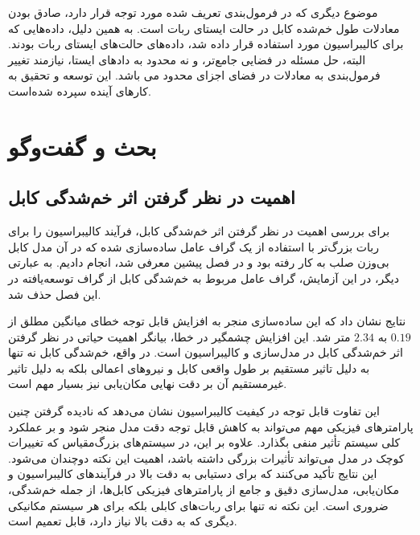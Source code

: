 موضوع دیگری که در فرمول‌بندی تعریف شده مورد توجه قرار دارد، صادق بودن معادلات طول خم‌شده کابل در حالت ایستای ربات است. به همین دلیل، داده‌هایی که برای کالیبراسیون مورد استفاده قرار داده‌ شد، داده‌‌های حالت‌های ایستای ربات بودند. البته، حل مسئله در فضایی جامع‌تر، و نه محدود به داد‌های ایستا، نیازمند تغییر فرمول‌بندی به معادلات در فضای اجزای محدود می باشد. این توسعه و تحقیق به کارهای آینده سپرده شده‌است.


\section{بحث و گفت‌وگو} \label{sec:discussion}

\subsection{اهمیت در نظر گرفتن اثر خم‌شدگی کابل}
برای بررسی اهمیت در نظر گرفتن اثر خم‌شدگی کابل، فرآیند کالیبراسیون را برای ربات بزرگ‌تر با استفاده از یک گراف عامل ساده‌سازی شده که در آن مدل کابل بی‌وزن صلب به کار رفته بود و در فصل پیشین معرفی شد، انجام دادیم. به عبارتی دیگر، در این آزمایش، گراف عامل مربوط به خم‌شدگی کابل از گراف توسعه‌یافته در این فصل حذف شد. 

نتایج نشان داد که این ساده‌سازی منجر به افزایش قابل توجه خطای میانگین مطلق از $0.19$ به $2.34$ متر شد. این افزایش چشمگیر در خطا، بیانگر اهمیت حیاتی در نظر گرفتن اثر خم‌شدگی کابل در مدل‌سازی و کالیبراسیون است. در واقع، خم‌شدگی کابل نه تنها به دلیل تاثیر مستقیم بر طول واقعی کابل و نیروهای اعمالی بلکه به دلیل تاثیر غیرمستقیم آن بر دقت نهایی مکان‌یابی نیز بسیار مهم است.

این تفاوت قابل توجه در کیفیت کالیبراسیون نشان می‌دهد که نادیده گرفتن چنین پارامترهای فیزیکی مهم می‌تواند به کاهش قابل توجه دقت مدل منجر شود و بر عملکرد کلی سیستم تأثیر منفی بگذارد. علاوه بر این، در سیستم‌های بزرگ‌مقیاس که تغییرات کوچک در مدل می‌تواند تأثیرات بزرگی داشته باشد، اهمیت این نکته دوچندان می‌شود. این نتایج تأکید می‌کنند که برای دستیابی به دقت بالا در فرآیندهای کالیبراسیون و مکان‌یابی، مدل‌سازی دقیق و جامع از پارامترهای فیزیکی کابل‌ها، از جمله خم‌شدگی، ضروری است. این نکته نه تنها برای ربات‌های کابلی بلکه برای هر سیستم مکانیکی دیگری که به دقت بالا نیاز دارد، قابل تعمیم است.



